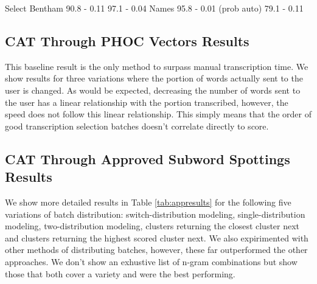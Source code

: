 \documentclass[ms,electronic,twosidetoc,letterpaper,chaptercenter,parttop,lol,lof,lot]{byumsphd}
\begin{document}
Select
Bentham
90.8 - 0.11
97.1 - 0.04
Names
95.8 - 0.01 (prob auto)
79.1 - 0.11

\subsection{CAT Through PHOC Vectors Results}
This baseline result is the only method to surpass manual transcription time. We show results for three variations where the portion of words actually sent to the user is changed. As would be expected, decreasing the number of words sent to the user has a linear relationship with the portion transcribed, however, the speed does not follow this linear relationship. This simply means that the order of good transcription selection batches doesn't correlate directly to score.

\subsection{CAT Through Approved Subword Spottings Results}

We show more detailed results in Table \ref{tab:appresults} for the following five variations of batch distribution: switch-distribution modeling, single-distribution modeling, two-distribution modeling, clusters returning the closest cluster next and clusters returning the highest scored cluster next. We also expirimented with other methods of distributing batches, however, these far outperformed the other approaches. We don't show an exhustive list of n-gram combinations but show those that both cover a variety and were the best performing.
\end{document}
